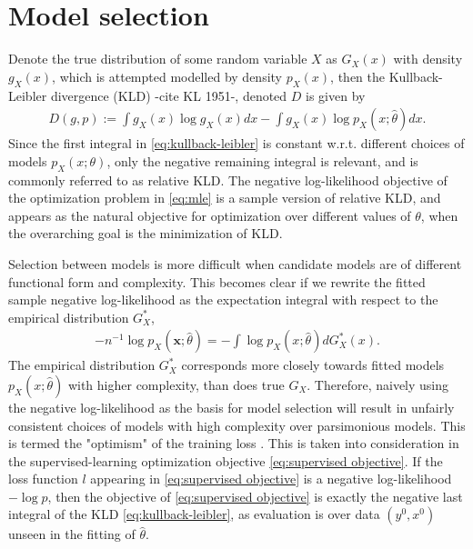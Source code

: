 \section{Model selection}
\label{sec:model selection}


Denote the true distribution of some random variable $X$ as $G_X(x)$ with density $g_X(x)$, which is attempted modelled by density $p_X(x)$, then the Kullback-Leibler divergence (KLD) -cite KL 1951-, denoted $D$ is given by 
\begin{align}\label{eq:kullback-leibler}
	D(g,p)
	:= \int g_X(x)\log g_X(x) dx - \int g_X(x)\log p_X(x;\hat{\theta}) dx.
\end{align}
Since the first integral in \eqref{eq:kullback-leibler} is constant w.r.t. different choices of models $p_X(x;\theta)$, only the negative remaining integral is relevant, and is commonly referred to as relative KLD.
The negative log-likelihood objective of the optimization problem in \eqref{eq:mle} is a sample version of relative KLD, and appears as the natural objective for optimization over different values of $\theta$, when the overarching goal is the minimization of KLD.

Selection between models is more difficult when candidate models are of different functional form and complexity.
This becomes clear if we rewrite the fitted sample negative log-likelihood as the expectation integral with respect to the empirical distribution $G_X^*$,
\begin{align}\label{eq:loss-wrt-empirical-distribution}
	-n^{-1}\log p_X(\mathbf{x};\hat\theta) = -\int \log p_X(x;\hat{\theta}) dG_X^*(x).
\end{align}
The empirical distribution $G_X^*$ corresponds more closely towards fitted models $p_X(x;\hat\theta)$ with higher complexity, than does true $G_X$.
Therefore, naively using the negative log-likelihood as the basis for model selection will result in unfairly consistent choices of models with high complexity over parsimonious models.
This is termed the "optimism" of the training loss \citep{friedman2001elements}.
This is taken into consideration in the supervised-learning optimization objective \eqref{eq:supervised objective}.
If the loss function $l$ appearing in \eqref{eq:supervised objective} is a negative log-likelihood $-\log p$, then the objective of \eqref{eq:supervised objective} is exactly the negative last integral of the KLD \eqref{eq:kullback-leibler}, as evaluation is over data $(y^0,x^0)$ unseen in the fitting of $\hat\theta$.

